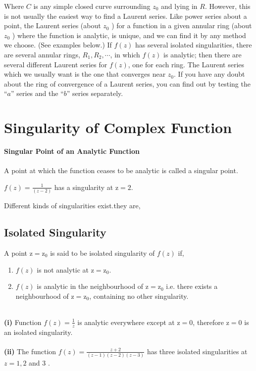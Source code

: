 Where $C$ is any simple closed curve surrounding $z_{0}$ and lying in $R$. However, this is not usually the easiest way to find a Laurent series. Like power series about a point, the Laurent series (about $z_{0}$ ) for a function in a given annular ring (about $z_{0}$ ) where the function is analytic, is unique, and we can find it by any method we choose. (See examples below.) If $f(z)$ has several isolated singularities, there are several annular rings, $R_{1}, R_{2}, \cdots$, in which $f(z)$ is analytic; then there are several different Laurent series for $f(z)$, one for each ring. The Laurent series which we usually want is the one that converges near $z_{0}$. If you have any doubt about the ring of convergence of a Laurent series, you can find out by testing the ``$a$'' series and the ``$b$'' series separately.
\section{Singularity of Complex Function}
\textbf{\large{Singular Point of an Analytic Function}}\\\\
A point at which the function ceases to be analytic is called a singular point.\\
\begin{example}
$f(z)=\frac{1}{(z-2)}$ has a singularity at $\mathrm{z}=2$.
\end{example} 
Different kinds of singularities exist.they are,
\subsection{Isolated Singularity}
A point $\mathrm{z}=\mathrm{z}_{0}$ is said to be isolated singularity of $f(z)$ if,
\begin{enumerate}[label=(\alph*)]
	\item  $f(z)$ is not analytic at $\mathrm{z}=\mathrm{z}_{0}$.
	\item  $f(z)$ is analytic in the neighbourhood of $\mathrm{z}=\mathrm{z}_{0}$ i.e. there exists a neighbourhood of $\mathrm{z}=\mathrm{z}_{0}$, containing no other singularity.
\end{enumerate}

\begin{example}$\left. \right. $\\\\
	\textbf{(i)} Function $f(z)=\frac{1}{z}$ is analytic everywhere except at $\mathrm{z}=0$, therefore $\mathrm{z}=0$ is an isolated singularity.\\\\
	\textbf{(ii)} The function $f(z)=\frac{z+2}{(z-1)(z-2)(z-3)}$ has three isolated singularities at $z=1,2$ and 3 .
\end{example}
